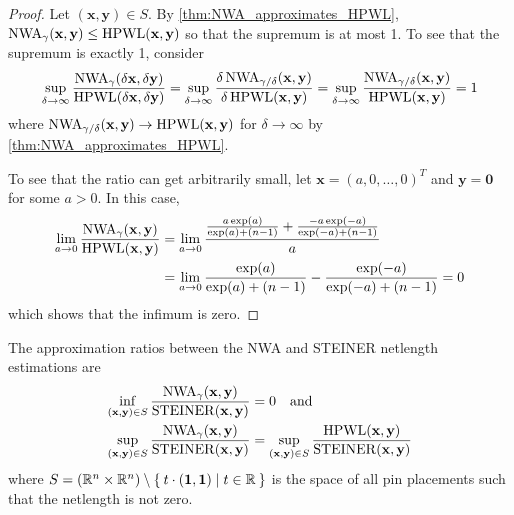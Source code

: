 \begin{proof}
 Let \((\mathbf{x}, \mathbf{y}) \in S \).
 By \cref{thm:NWA_approximates_HPWL}, \(\operatorname{NWA}_\gamma (\mathbf{x}, \mathbf{y}) \leq \operatorname{HPWL} (\mathbf{x}, \mathbf{y}) \)
 so that the supremum is at most 1.
 To see that the supremum is exactly 1, consider
 \[
      \sup_{\delta \to \infty} \frac{\operatorname{NWA}_\gamma (\delta \mathbf{x}, \delta \mathbf{y})}{\operatorname{HPWL} (\delta \mathbf{x}, \delta \mathbf{y})} 
    = \sup_{\delta \to \infty} \frac{\delta \operatorname{NWA}_{\gamma/\delta} (\mathbf{x}, \mathbf{y})}{\delta \operatorname{HPWL} (\mathbf{x}, \mathbf{y})}
    = \sup_{\delta \to \infty} \frac{\operatorname{NWA}_{\gamma/\delta} (\mathbf{x}, \mathbf{y})}{\operatorname{HPWL} (\mathbf{x}, \mathbf{y})}
    = 1
 \]
 where \(\operatorname{NWA}_{\gamma/\delta} (\mathbf{x}, \mathbf{y}) \to \operatorname{HPWL} (\mathbf{x}, \mathbf{y})\) for \(\delta \to \infty\) by \cref{thm:NWA_approximates_HPWL}.
 
 To see that the ratio can get arbitrarily small, let \(\mathbf{x} = (a, 0, \ldots, 0)^T \) and \(\mathbf{y} = \mathbf{0}\) for some \(a > 0\).
 In this case, 
 \begin{align*}
      \lim_{a \to 0} \frac{\operatorname{NWA}_\gamma(\mathbf{x}, \mathbf{y})}{\operatorname{HPWL}(\mathbf{x}, \mathbf{y})} 
    &= \lim_{a \to 0} \frac{\frac{a \exp(a)}{\exp(a) + (n-1)} + \frac{-a \exp(-a)}{\exp(-a) + (n-1)}}{a} \\
    &= \lim_{a \to 0} \frac{\exp(a)}{\exp(a) + (n-1)} - \frac{\exp(-a)}{\exp(-a) + (n-1)}
    = 0
 \end{align*}
 which shows that the infimum is zero.
\end{proof}


\begin{theorem} \label{thm:NWA_STEINER_approximation_ratios}
 The approximation ratios between the NWA and STEINER netlength estimations are
 \begin{align*}
  \inf_{(\mathbf{x}, \mathbf{y}) \in S} \frac{\operatorname{NWA}_\gamma(\mathbf{x}, \mathbf{y})}{\operatorname{STEINER}(\mathbf{x}, \mathbf{y})} &= 0 \quad \text{and} \\
  \sup_{(\mathbf{x}, \mathbf{y}) \in S} \frac{\operatorname{NWA}_\gamma(\mathbf{x}, \mathbf{y})}{\operatorname{STEINER}(\mathbf{x}, \mathbf{y})} &= \sup_{(\mathbf{x}, \mathbf{y}) \in S} \frac{\operatorname{HPWL}(\mathbf{x}, \mathbf{y})}{\operatorname{STEINER}(\mathbf{x}, \mathbf{y})}
 \end{align*}
 where \(S = (\mathbb{R}^n \times \mathbb{R}^n) \setminus \Set{ t \cdot (\mathbf{1}, \mathbf{1}) | t \in \mathbb{R}} \)
 is the space of all pin placements such that the netlength is not zero.
\end{theorem}

